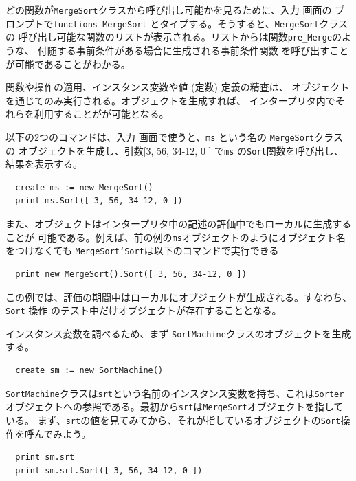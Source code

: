 \documentclass[\pformat,12pt]{jarticle}
\newcommand{\aaa}{\tt }
\newcommand{\cmd}{\tt }
\newcommand{\guicmd}[1]{{\gt #1}}
\begin{document}
どの関数が{\aaa MergeSort}クラスから呼び出し可能かを見るために、\guicmd{入力} 画面の
プロンプトで{\cmd functions MergeSort} とタイプする。そうすると、{\aaa MergeSort}クラスの
呼び出し可能な関数のリストが表示される。リストからは関数{\aaa pre\_Merge}のような、
付随する事前条件がある場合に生成される事前条件関数
を呼び出すことが可能であることがわかる。

関数や操作の適用、インスタンス変数や値 (定数) 定義の精査は、
オブジェクトを通じてのみ実行される。オブジェクトを生成すれば、
インタープリタ内でそれらを利用することがが可能となる。

以下の2つのコマンドは、\guicmd{入力} 画面で使うと、{\aaa ms} という名の {\aaa MergeSort}クラスの
オブジェクトを生成し、引数[3, 56, 34-12, 0 ] で{\tt ms} の{\tt Sort}関数を呼び出し、
結果を表示する。

\begin{verbatim}
  create ms := new MergeSort()
  print ms.Sort([ 3, 56, 34-12, 0 ])
\end{verbatim}

また、オブジェクトはインタープリタ中の記述の評価中でもローカルに生成することが
可能である。例えば、前の例の{\tt ms}オブジェクトのようにオブジェクト名をつけなくても
{\tt MergeSort`Sort}は以下のコマンドで実行できる 

\begin{verbatim}
  print new MergeSort().Sort([ 3, 56, 34-12, 0 ])
\end{verbatim}

この例では、評価の期間中はローカルにオブジェクトが生成される。すなわち、{\tt Sort} 操作
のテスト中だけオブジェクトが存在することとなる。

インスタンス変数を調べるため、まず {\tt SortMachine}クラスのオブジェクトを生成する。

\begin{verbatim}
  create sm := new SortMachine()
\end{verbatim}

{\tt SortMachine}クラスは{\tt srt}という名前のインスタンス変数を持ち、これは{\tt Sorter}
オブジェクトへの参照である。最初から{\tt srt}は{\tt MergeSort}オブジェクトを指している。
まず、{\tt srt}の値を見てみてから、それが指しているオブジェクトの{\tt Sort}操作を呼んでみよう。

\begin{verbatim}
  print sm.srt
  print sm.srt.Sort([ 3, 56, 34-12, 0 ])
\end{verbatim}
\end{document}
